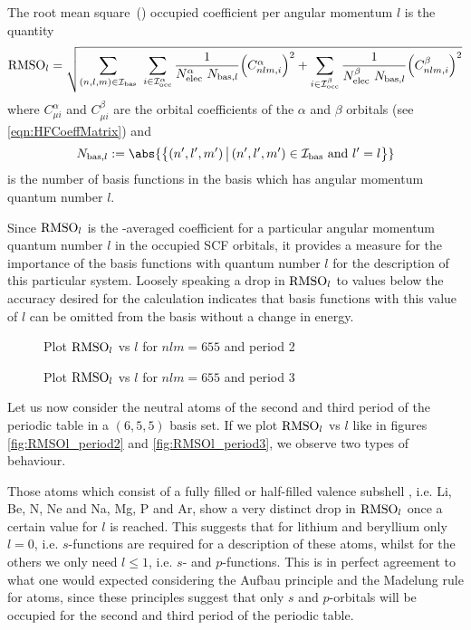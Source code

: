 \defineabbr{RMS}{RMS\xspace}{root mean square}
\begin{defn}
	\label{defn:RMSOl}
	The root mean square~(\RMS) occupied coefficient per angular momentum $l$
	is the quantity
	\begin{equation}
	\text{RMSO}_l =
		\sqrt{
		\sum_{(n,l,m) \in \mathcal{I}_\text{bas}} \
		\sum_{i \in \mathcal{I}_\text{occ}^\alpha} \frac{1}{N_\text{elec}^\alpha \ N_{\text{bas}, l}}
			\Big(C^\alpha_{nlm, i} \Big)^2
			+ \sum_{i \in \mathcal{I}_\text{occ}^\beta} \frac{1}{N_\text{elec}^\beta \ N_{\text{bas}, l}}
			\Big( C^\beta_{nlm, i} \Big)^2
		}
		\label{eqn:DefRMSOl}
	\end{equation}
	where $C^\alpha_{\mu i}$ and $C^\beta_{\mu i}$
	are the orbital coefficients of the $\alpha$ and $\beta$ orbitals
	(see \eqref{eqn:HFCoeffMatrix})
	and
	\[
		N_{\text{bas}, l} := \abs{ \left\{ (n',l',m') \, \big|\, (n',l',m') \in \Ibas
			\ \text{and} \ l' = l \right\} }
	\]
	is the number of basis functions in the \CS basis which has angular momentum
	quantum number $l$.
\end{defn}
Since $\text{RMSO}_l$ is the \RMS-averaged coefficient for a particular angular
momentum quantum number $l$ in the occupied SCF orbitals,
it provides a measure for the importance of the \CS basis functions
with quantum number $l$ for the description of this particular system.
Loosely speaking a drop in $\text{RMSO}_l$ to values below the
accuracy desired for the calculation indicates that basis functions with
this value of $l$ can be omitted from the basis without a change in \HF energy.

\begin{figure}
	\centering
	\caption{Plot $\text{RMSO}_l$ vs $l$ for $nlm = 655$ and period 2}
	\label{fig:RMSOl_period2}
\end{figure}

\begin{figure}
	\centering
	\caption{Plot $\text{RMSO}_l$ vs $l$ for $nlm = 655$ and period 3}
	\label{fig:RMSOl_period3}
\end{figure}
Let us now consider the neutral atoms of the second and third period of
the periodic table in a $(6,5,5)$ \CS basis set.
If we plot $\text{RMSO}_l$ vs $l$ like in figures \vref{fig:RMSOl_period2}
and \vref{fig:RMSOl_period3}, we observe two types of behaviour.

Those atoms which consist of a fully filled or half-filled valence subshell
, i.e. Li, Be, N, Ne and Na, Mg, P and Ar,
show a very distinct drop in $\text{RMSO}_l$ once a certain value
for $l$ is reached.
This suggests that for lithium and beryllium only $l=0$,
i.e. $s$-functions are required for a description of these atoms,
whilst for the others we only need $l \leq 1$, i.e. $s$- and $p$-functions.
This is in perfect agreement to what one would expected
considering the Aufbau principle and the Madelung rule
for atoms,
since these principles suggest that only $s$ and $p$-orbitals will be
occupied for the second and third period of the periodic table.

